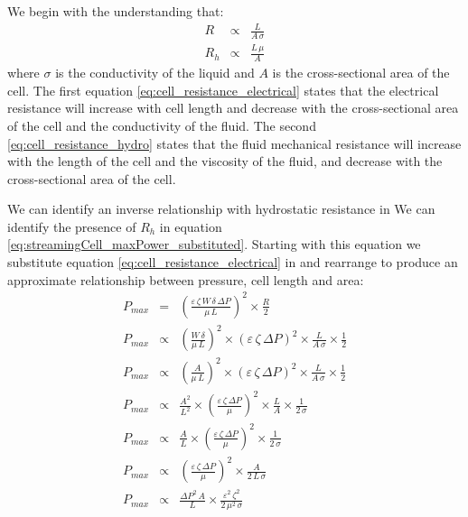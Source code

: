       We begin with the understanding that:
      \begin{eqnarray}
          R & \propto & \frac{L}{A\,\sigma}\label{eq:cell_resistance_electrical}\\
          R_{h} & \propto & \frac{L\,\mu}{A}\label{eq:cell_resistance_hydro}
      \end{eqnarray}
      where $\sigma$ is the conductivity of the liquid and $A$ is the cross-sectional area of the cell.
      The first equation \eqref{eq:cell_resistance_electrical} states that the electrical resistance will increase with cell length and decrease with the cross-sectional area of the cell and the conductivity of the fluid.
      The second \eqref{eq:cell_resistance_hydro} states that the fluid mechanical resistance will increase with the length of the cell and the viscosity of the fluid, and decrease with the cross-sectional area of the cell.

      We can identify an inverse relationship with hydrostatic resistance in
      We can identify the presence of $R_{h}$ in equation \eqref{eq:streamingCell_maxPower_substituted}.
      Starting with this equation we substitute equation \eqref{eq:cell_resistance_electrical} in and rearrange to produce an approximate relationship between pressure, cell length and area:
      \begin{eqnarray}
          P_{max} & = & \left(\frac{\varepsilon\,\zeta\,W\,\delta\,\Delta P}{\mu\,L}\right)^{2}\times\frac{R}{2}\nonumber\\
          P_{max} & \propto & \left(\frac{W\,\delta}{\mu\,L}\right)^{2}\times\left(\varepsilon\,\zeta\,\Delta P\right)^{2}\times \frac{L}{A\,\sigma} \times\frac{1}{2}\nonumber\\
          P_{max} & \propto & \left(\frac{A}{\mu\,L}\right)^{2}\times\left(\varepsilon\,\zeta\,\Delta P\right)^{2}\times \frac{L}{A\,\sigma} \times\frac{1}{2}\nonumber\\
          P_{max} & \propto & \frac{A^{2}}{L^{2}}\times\left(\frac{\varepsilon\,\zeta\,\Delta P}{\mu}\right)^{2}\times \frac{L}{A} \times\frac{1}{2\,\sigma}\nonumber\\
          P_{max} & \propto & \frac{A}{L}\times\left(\frac{\varepsilon\,\zeta\,\Delta P}{\mu}\right)^{2}\times\frac{1}{2\,\sigma}\nonumber\\
          P_{max} & \propto & \left(\frac{\varepsilon\,\zeta\,\Delta P}{\mu}\right)^{2}\times\frac{A}{2\,L\,\sigma}\nonumber\\
          P_{max} & \propto & \frac{\Delta P^{2}\,A}{L}\times \frac{\varepsilon^{2}\,\zeta^{2}}{2\,\mu^{2}\,\sigma}
          \label{eq:streamingCell_maxPower_relationship}
      \end{eqnarray}

